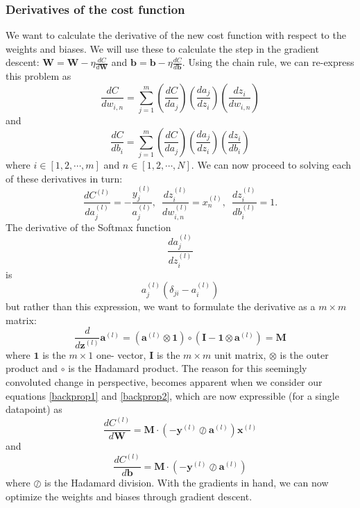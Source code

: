\documentclass[11pt,a4paper,titlepage]{article}
\begin{document}
\subsubsection{Derivatives of the cost function}
We want to calculate the derivative of the new cost function with respect to the weights and biases. We will use these to calculate the step in the gradient descent:
$\textbf{W} = \textbf{W} -\eta \frac{d C}{d\textbf{W} }$ and $\textbf{b} = \textbf{b} -\eta \frac{d C}{d\textbf{b} }$. Using the chain rule, we can re-express this problem as
\begin{equation}\label{backprop1}
\frac{dC}{dw_{i,n}} = \sum_{j=1}^m \left (\frac{dC}{da_j} \right) \left (\frac{da_j}{dz_i} \right) \left(\frac{dz_i}{dw_{i,n}} \right )
\end{equation}
and
\begin{equation}\label{backprop2}
\frac{dC}{db_i} = \sum_{j=1}^m \left (\frac{dC}{da_j} \right) \left (\frac{da_j}{dz_i} \right) \left(\frac{dz_i}{db_i} \right )
\end{equation}
where $i \in [1,2,\cdots,m]$ and $n \in [1,2,\cdots,N]$. We can now proceed to solving each of these derivatives in turn:
\begin{equation}
\frac{dC^{(l)}}{da_j^{(l)}} = - \frac{y_j^{(l)}}{a_j^{(l)}},\,\,\, \frac{dz_i^{(l)}}{dw_{i,n}^{(l)}} =  x_n^{(l)},\,\,\, \frac{dz_i^{(l)}}{db_i^{(l)}} =  1.
\end{equation}
The derivative of the Softmax function $$\frac{da_j^{(l)}}{dz_i^{(l)}}$$ is $$a_j^{(l)}(\delta_{ji}-a^{(l)}_i)$$ but rather than this expression, we want to formulate the derivative as a $m \times m$ matrix:
\begin{equation}
\frac{d}{d \textbf{z}^{(l)}} \textbf{a}^{(l)} = (\textbf{a}^{(l)} \otimes \mathbf{1} )\circ (\mathbf{I} - \mathbf{1} \otimes \textbf{a}^{(l)}) = \textbf{M}
\end{equation}
where $\mathbf{1}$ is the $m \times 1$ one- vector, $ \mathbf{I} $ is the $m \times m$ unit matrix, $\otimes$ is the outer product and $\circ$ is the Hadamard product. The reason for this seemingly convoluted change in perspective, becomes apparent when we consider our equations \eqref{backprop1} and \eqref{backprop2}, which are now expressible (for a single datapoint) as
\begin{equation}
\frac{dC^{(l)}}{d\textbf{W}} =  \textbf{M}\cdot(- \textbf{y}^{(l)}\oslash \textbf{a}^{(l)}) \textbf{x}^{(l)}
\end{equation}
and
\begin{equation}
\frac{dC^{(l)}}{d\textbf{b}} =  \textbf{M}\cdot(- \textbf{y}^{(l)}\oslash \textbf{a}^{(l)}) 
\end{equation}
where $\oslash$ is the Hadamard division. With the gradients in hand, we can now optimize the weights and biases through gradient descent.
\end{document}
